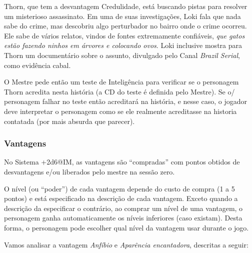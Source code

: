 Thorn, que tem a desvantagem Credulidade, está buscando pistas para resolver um misterioso assassinato. Em uma de suas investigações, Loki fala que nada sabe do crime, mas descobriu algo perturbador no bairro onde o crime ocorreu. Ele sabe de vários relatos, vindos de fontes extremamente confiáveis, \emph{que gatos estão fazendo ninhos em árvores e colocando ovos}. Loki inclusive mostra para Thorn um documentário sobre o assunto, divulgado pelo Canal \emph{Brazil Serial}, como evidência cabal.

O Mestre pede então um teste de Inteligência para verificar se o personagem Thorn acredita nesta história (a CD do teste é definida pelo Mestre). Se o/ personagem falhar no teste então acreditará na história, e nesse caso, o jogador deve interpretar o personagem como se ele realmente acreditasse na historia contatada (por mais absurda que parecer).

\subsubsection*{Vantagens}

No Sistema +2d6@IM, as vantagens são ``compradas'' com pontos obtidos de desvantagens e/ou liberados pelo mestre na sessão zero. 


O nível (ou ``poder'') de cada vantagem depende do custo de compra (1 a 5 pontos) e está especificado na descrição de cada vantagem. Exceto quando a descrição da especificar o contrário, ao comprar um nível de uma vantagem, o personagem ganha automaticamente os níveis inferiores (caso existam). Desta forma, o personagem pode escolher qual nível da vantagem usar durante o jogo. 

Vamos analisar a vantagem \emph{Anfíbio} e \emph{Aparência encantadora}, descritas a seguir:

